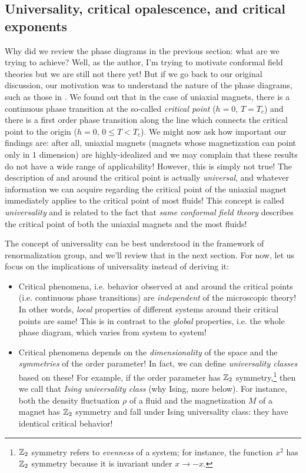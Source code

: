 \subsection{Universality, critical opalescence, and critical exponents}
Why did we review the phase diagrams in the previous section: what are we trying to achieve? Well, as the author, I'm trying to motivate conformal field theories but we are still not there yet! But if we go back to our original discussion, our motivation was to understand the nature of the phase diagrams, such as those in \figref{\ref{fig: phase diagram}}. We found out that in the case of uniaxial magnets, there is a continuous phase transition at the so-called \emph{critical point} (\mbox{$h=0$}, \mbox{$T=T_c$}) and there is a first order phase transition along the line which connects the critical point to the origin (\mbox{$h=0$}, \mbox{$0\le T< T_c$}). We might now ask how important our findings are: after all, uniaxial magnets (magnets whose magnetization can point only in $1$ dimension) are highly-idealized and we may \naively complain that these results do not have a wide range of applicability! However, this is simply not true! The description of and around the critical point is actually \emph{universal}, and whatever information we can acquire regarding the critical point of the uniaxial magnet immediately applies to the critical point of most fluids! This concept is called \emph{universality} and is related to the fact that \emph{same conformal field theory} describes the critical point of both the uniaxial magnets and the most fluids!

The concept of universality can be best understood in the framework of renormalization group, and we'll review that in the next section. For now, let us focus on the implications of universality instead of deriving it:
\begin{itemize}
	\label{items: implications of universality}
	\item Critical phenomena, i.e. behavior observed at and around the critical points (i.e. continuous phase transitions) are \emph{independent} of the microscopic theory! In other words, \emph{local} properties of  different systems around their critical points are same! This is in contrast to the \emph{global} properties, i.e. the whole phase diagram, which varies from system to system!
	\item Critical phenomena depends on the \emph{dimensionality} of the space  and the \emph{symmetries} of the order parameter! In fact, we can define \emph{universality classes} based on these! For example, if the order parameter has $\mathbb{Z}_2$ symmetry,\footnote{$\mathbb{Z}_2$ symmetry refers to \emph{evenness} of a system; for instance, the function $x^2$ has $\mathbb{Z}_2$ symmetry because it is invariant under $x\rightarrow -x$.} then we call that \emph{Ising universality class} (why Ising, more below). For instance, both the density fluctuation $\rho$ of a fluid and the magnetization $M$ of a magnet has $\mathbb{Z}_2$ symmetry and fall under Ising universality class: they have identical critical behavior!
\end{itemize}

